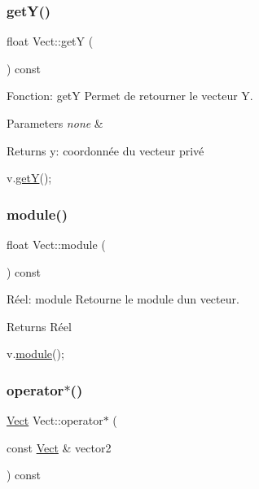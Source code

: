 \subsubsection{\texorpdfstring{get\+Y()}{getY()}}
{\footnotesize\ttfamily float Vect\+::getY (\begin{DoxyParamCaption}{ }\end{DoxyParamCaption}) const}



Fonction\+: getY Permet de retourner le vecteur Y. 


\begin{DoxyParams}{Parameters}
{\em none} & \\
\hline
\end{DoxyParams}
\begin{DoxyReturn}{Returns}
y\+: coordonnée du vecteur privé 
\begin{DoxyCode}
v.\hyperlink{classVect_a2e44111683aae147cd053ac6002f5992}{getY}();
\end{DoxyCode}
 
\end{DoxyReturn}
\mbox{\label{classVect_aa61c71b79a4d2f2cda092648a7268c4f}} 
\subsubsection{\texorpdfstring{module()}{module()}}
{\footnotesize\ttfamily float Vect\+::module (\begin{DoxyParamCaption}{ }\end{DoxyParamCaption}) const}



Réel\+: module Retourne le module d\textquotesingle{}un vecteur. 

\begin{DoxyReturn}{Returns}
Réel 
\begin{DoxyCode}
v.\hyperlink{classVect_aa61c71b79a4d2f2cda092648a7268c4f}{module}();
\end{DoxyCode}
 
\end{DoxyReturn}
\mbox{\label{classVect_ab3dce1a30e0626a88cd726aa0d4f78e5}} 
\subsubsection{\texorpdfstring{operator$\ast$()}{operator*()}}
{\footnotesize\ttfamily \hyperlink{classVect}{Vect} Vect\+::operator$\ast$ (\begin{DoxyParamCaption}\item[{const \hyperlink{classVect}{Vect} \&}]{vector2 }\end{DoxyParamCaption}) const}



